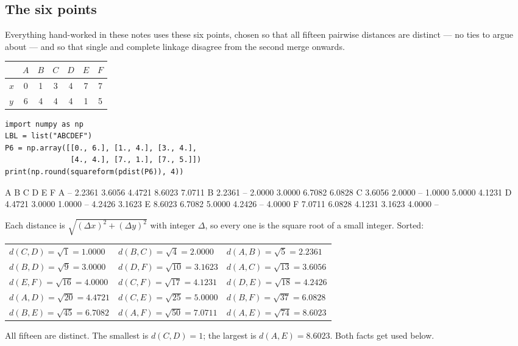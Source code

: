 \documentclass[11pt]{article}
\begin{document}
\subsection{The six points}

Everything hand-worked in these notes uses these six points, chosen so that all
fifteen pairwise distances are distinct --- no ties to argue about --- and so
that single and complete linkage disagree from the second merge onwards.

\begin{center}
\begin{tabular}{lcccccc}
  \toprule
  & $A$ & $B$ & $C$ & $D$ & $E$ & $F$ \\
  \midrule
  $x$ & 0 & 1 & 3 & 4 & 7 & 7 \\
  $y$ & 6 & 4 & 4 & 4 & 1 & 5 \\
  \bottomrule
\end{tabular}
\end{center}

\begin{lstlisting}
import numpy as np
LBL = list("ABCDEF")
P6 = np.array([[0., 6.], [1., 4.], [3., 4.],
               [4., 4.], [7., 1.], [7., 5.]])
print(np.round(squareform(pdist(P6)), 4))
\end{lstlisting}
\begin{codeout}
                 A       B       C       D       E       F
A               --  2.2361  3.6056  4.4721  8.6023  7.0711
B           2.2361      --  2.0000  3.0000  6.7082  6.0828
C           3.6056  2.0000      --  1.0000  5.0000  4.1231
D           4.4721  3.0000  1.0000      --  4.2426  3.1623
E           8.6023  6.7082  5.0000  4.2426      --  4.0000
F           7.0711  6.0828  4.1231  3.1623  4.0000      --
\end{codeout}

\begin{worked}
Each distance is $\sqrt{(\Delta x)^2 + (\Delta y)^2}$ with integer $\Delta$, so
every one is the square root of a small integer. Sorted:
\begin{center}\footnotesize
\begin{tabular}{lll}
  \toprule
  $d(C,D) = \sqrt{1} = 1.0000$ & $d(B,C) = \sqrt{4} = 2.0000$ &
  $d(A,B) = \sqrt{5} = 2.2361$ \\
  $d(B,D) = \sqrt{9} = 3.0000$ & $d(D,F) = \sqrt{10} = 3.1623$ &
  $d(A,C) = \sqrt{13} = 3.6056$ \\
  $d(E,F) = \sqrt{16} = 4.0000$ & $d(C,F) = \sqrt{17} = 4.1231$ &
  $d(D,E) = \sqrt{18} = 4.2426$ \\
  $d(A,D) = \sqrt{20} = 4.4721$ & $d(C,E) = \sqrt{25} = 5.0000$ &
  $d(B,F) = \sqrt{37} = 6.0828$ \\
  $d(B,E) = \sqrt{45} = 6.7082$ & $d(A,F) = \sqrt{50} = 7.0711$ &
  $d(A,E) = \sqrt{74} = 8.6023$ \\
  \bottomrule
\end{tabular}
\end{center}
All fifteen are distinct. The smallest is $d(C,D) = 1$; the largest is
$d(A,E) = 8.6023$. Both facts get used below.
\end{worked}
\end{document}
